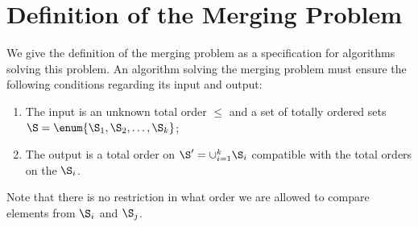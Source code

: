 \section{Definition of the Merging Problem}
\label{tree:merging:def}

We give the definition of the merging problem as a specification for algorithms
solving this problem.
An algorithm solving the merging problem must ensure the following conditions
regarding its input and output:

\begin{enumerate}
\item The input is an unknown total order \(\le\) and a set of totally ordered
sets \(\S = \enum{\S_1, \S_2, \ldots, \S_k}\);
\item The output is a total order on \(\S' = \cup_{i=1}^{k} \S_i\) compatible with
the total orders on the \(\S_i\).
\end{enumerate}

Note that there is no restriction in what order we are allowed to compare
elements from \(\S_i\) and \(\S_j\).


